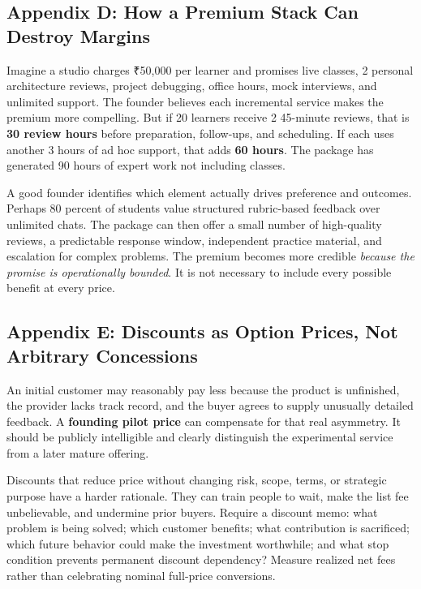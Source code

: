 \subsection*{Appendix D: How a Premium Stack Can Destroy Margins}

Imagine a studio charges ₹50,000 per learner and promises live classes, 2 personal architecture reviews, project debugging, office hours, mock interviews, and unlimited support. The founder believes each incremental service makes the premium more compelling. But if 20 learners receive 2 45-minute reviews, that is \textbf{30 review hours} before preparation, follow-ups, and scheduling. If each uses another 3 hours of ad hoc support, that adds \textbf{60 hours}. The package has generated 90 hours of expert work not including classes.

A good founder identifies which element actually drives preference and outcomes. Perhaps 80 percent of students value structured rubric-based feedback over unlimited chats. The package can then offer a small number of high-quality reviews, a predictable response window, independent practice material, and escalation for complex problems. The premium becomes more credible \emph{because the promise is operationally bounded}. It is not necessary to include every possible benefit at every price.

\subsection*{Appendix E: Discounts as Option Prices, Not Arbitrary Concessions}

An initial customer may reasonably pay less because the product is unfinished, the provider lacks track record, and the buyer agrees to supply unusually detailed feedback. A \textbf{founding pilot price} can compensate for that real asymmetry. It should be publicly intelligible and clearly distinguish the experimental service from a later mature offering.

Discounts that reduce price without changing risk, scope, terms, or strategic purpose have a harder rationale. They can train people to wait, make the list fee unbelievable, and undermine prior buyers. Require a discount memo: what problem is being solved; which customer benefits; what contribution is sacrificed; which future behavior could make the investment worthwhile; and what stop condition prevents permanent discount dependency? Measure realized net fees rather than celebrating nominal full-price conversions.
